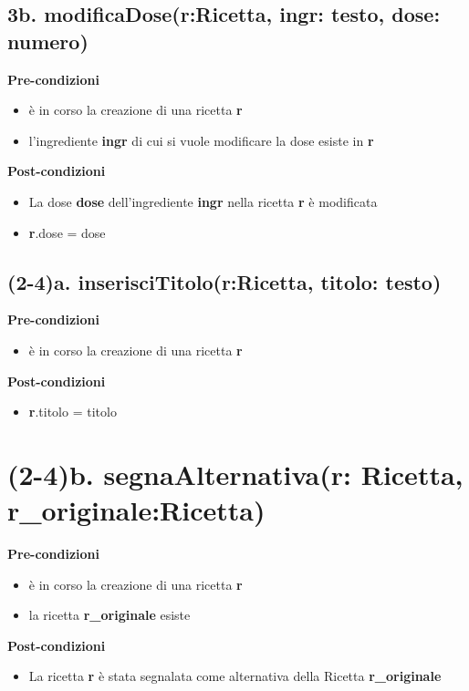 \documentclass[12pt]{extarticle}
\begin{document}
\subsection*{3b. modificaDose(r:Ricetta, ingr: testo, dose: numero)}

\textbf{Pre-condizioni}
\begin{itemize}
  \item è in corso la creazione di una ricetta  \textbf{r}
  \item l'ingrediente \textbf{ingr} di cui si vuole modificare la dose esiste in \textbf{r}
\end{itemize}
\textbf{Post-condizioni}
\begin{itemize}
  \item La dose \textbf{dose} dell'ingrediente \textbf{ingr} nella ricetta \textbf{r} è modificata
  \item \textbf{r}.dose = dose
\end{itemize}

\subsection*{(2-4)a. inserisciTitolo(r:Ricetta, titolo: testo)}

\textbf{Pre-condizioni}
\begin{itemize}
  \item è in corso la creazione di una ricetta  \textbf{r}
\end{itemize}
\textbf{Post-condizioni}
\begin{itemize}
  \item \textbf{r}.titolo = titolo
\end{itemize}

\section*{(2-4)b. segnaAlternativa(r: Ricetta, r\_originale:Ricetta)}

\textbf{Pre-condizioni}
\begin{itemize}
  \item è in corso la creazione di una ricetta  \textbf{r}
  \item la ricetta \textbf{r\_originale} esiste
\end{itemize}
\textbf{Post-condizioni}
\begin{itemize}
  \item La ricetta  \textbf{r} è stata segnalata come alternativa della Ricetta  \textbf{r\_originale}
\end{itemize}
\end{document}
